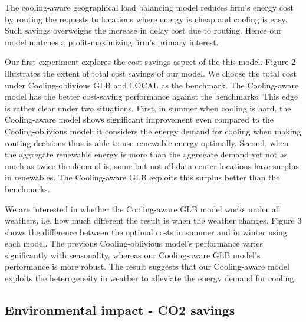 \documentclass{acm_proc_article-sp}
\begin{document}
The cooling-aware geographical load balancing model reduces firm's energy cost by routing the requests to locations where energy is cheap and cooling is easy. Such savings overweighs the increase in delay cost due to routing. Hence our model matches a profit-maximizing firm's primary interest.  


Our first experiment explores the cost savings aspect of the this model. Figure 2 illustrates the extent of total cost savings of our model. We choose the total cost under Cooling-oblivious GLB and LOCAL as the benchmark. The Cooling-aware model has the better cost-saving performance against the benchmarks. This edge is rather clear under two situations. First, in summer when cooling is hard, the Cooling-aware model shows significant improvement even compared to the Cooling-oblivious model; it considers the energy demand for cooling when making routing decisions thus is able to use renewable energy optimally. Second, when the aggregate renewable energy is more than the aggregate demand yet not as much as twice the demand is, some but not all data center locations have surplus in renewables. The Cooling-aware GLB exploits this surplus better than the benchmarks.

We are interested in whether the Cooling-aware GLB model works under all weathers, i.e. how much different the result is when the weather changes. Figure 3 shows the difference between the optimal costs in summer and in winter using each model. The previous Cooling-oblivious model's performance varies significantly with seasonality, whereas our Cooling-aware GLB model's performance is more robust. The result suggests that our Cooling-aware model exploits the heterogeneity in weather to alleviate the energy demand for cooling.    



\subsection{Environmental impact - CO2 savings}
\end{document}
